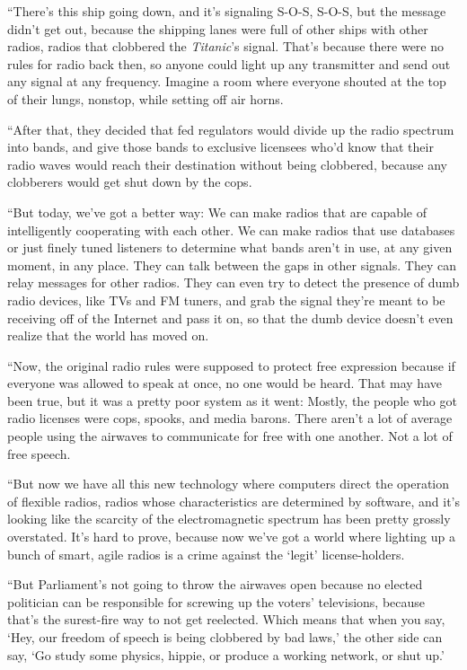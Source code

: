 ``There's this ship going down, and it's signaling S-O-S, S-O-S, but
the message didn't get out, because the shipping lanes were full of
other ships with other radios, radios that clobbered the
\textit{Titanic}'s signal.  That's because there were no rules for
radio back then, so anyone could light up any transmitter and send out
any signal at any frequency.  Imagine a room where everyone shouted at
the top of their lungs, nonstop, while setting off air horns.

``After that, they decided that fed regulators would divide up the
radio spectrum into bands, and give those bands to exclusive licensees
who'd know that their radio waves would reach their destination
without being clobbered, because any clobberers would get shut down by
the cops.

``But today, we've got a better way:  We can make radios that are
capable of intelligently cooperating with each other.  We can make
radios that use databases or just finely tuned listeners to determine
what bands aren't in use, at any given moment, in any place.  They can
talk between the gaps in other signals.  They can relay messages for
other radios.  They can even try to detect the presence of dumb radio
devices, like TVs and FM tuners, and grab the signal they're meant to
be receiving off of the Internet and pass it on, so that the dumb
device doesn't even realize that the world has moved on.

``Now, the original radio rules were supposed to protect free
expression because if everyone was allowed to speak at once, no one
would be heard.  That may have been true, but it was a pretty poor
system as it went:  Mostly, the people who got radio licenses were
cops, spooks, and media barons.  There aren't a lot of average people
using the airwaves to communicate for free with one another.  Not a
lot of free speech.

``But now we have all this new technology where computers direct the
operation of flexible radios, radios whose characteristics are
determined by software, and it's looking like the scarcity of the
electromagnetic spectrum has been pretty grossly overstated.  It's
hard to prove, because now we've got a world where lighting up a bunch
of smart, agile radios is a crime against the `legit' license-holders.

``But Parliament's not going to throw the airwaves open because no
elected politician can be responsible for screwing up the voters'
televisions, because that's the surest-fire way to not get reelected. 
Which means that when you say, `Hey, our freedom of speech is being
clobbered by bad laws,' the other side can say, `Go study some
physics, hippie, or produce a working network, or shut up.'

